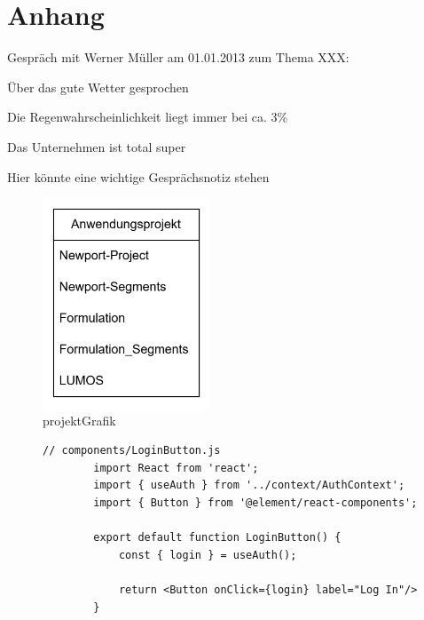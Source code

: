 \section*{Anhang}

\anhangsverzeichnis



Gespräch mit Werner Müller am 01.01.2013 zum Thema XXX:
\begin{compactitem}
   \item Über das gute Wetter gesprochen
   \item Die Regenwahrscheinlichkeit liegt immer bei ca. 3\%
   \item Das Unternehmen ist total super
   \item Hier könnte eine wichtige Gesprächsnotiz stehen
\end{compactitem}


\begin{figure}[h]
    \centering
    \includegraphics[width=5cm]{./img/projektGrafik.png}
    \caption{projektGrafik}
\end{figure}

\begin{figure}[H]
    \begin{lstlisting}[caption=JS-Code for the LogIn-Button, breaklines = true, label=list:loginbutton]
        // components/LoginButton.js
        import React from 'react';
        import { useAuth } from '../context/AuthContext';
        import { Button } from '@element/react-components';

        export default function LoginButton() {
            const { login } = useAuth();

            return <Button onClick={login} label="Log In"/>
        }
    \end{lstlisting}
\end{figure}

